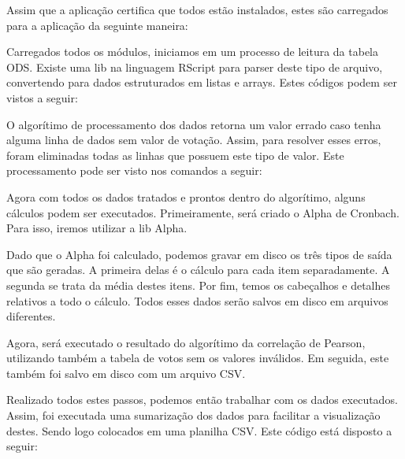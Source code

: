 

Assim que a aplicação certifica que todos estão instalados, estes são carregados
para a aplicação da seguinte maneira:



Carregados todos os módulos, iniciamos em um processo de leitura da tabela ODS.
Existe uma lib na linguagem RScript para parser deste tipo de arquivo, convertendo
para dados estruturados em listas e arrays. Estes códigos podem ser vistos a seguir:



O algorítimo de processamento dos dados retorna um valor errado caso tenha alguma
linha de dados sem valor de votação. Assim, para resolver esses erros, foram eliminadas
todas as linhas que possuem este tipo de valor. Este processamento pode ser visto nos
comandos a seguir:



Agora com todos os dados tratados e prontos dentro do algorítimo, alguns cálculos podem
ser executados. Primeiramente, será criado o Alpha de Cronbach. Para isso, iremos utilizar
a lib Alpha. 



Dado que o Alpha foi calculado, podemos gravar em disco os três tipos de saída que são geradas.
A primeira delas é o cálculo para cada item separadamente. A segunda se trata da média destes
itens. Por fim, temos os cabeçalhos e detalhes relativos a todo o cálculo. Todos esses dados serão
salvos em disco em arquivos diferentes. 



Agora, será executado o resultado do algorítimo da correlação de Pearson, utilizando
também a tabela de votos sem os valores inválidos. Em seguida, este também foi salvo em disco
com um arquivo CSV.



Realizado todos estes passos, podemos então trabalhar com os dados executados.
Assim, foi executada uma sumarização dos dados para facilitar a visualização destes.
Sendo logo colocados em uma planilha CSV. Este código está disposto a seguir:

